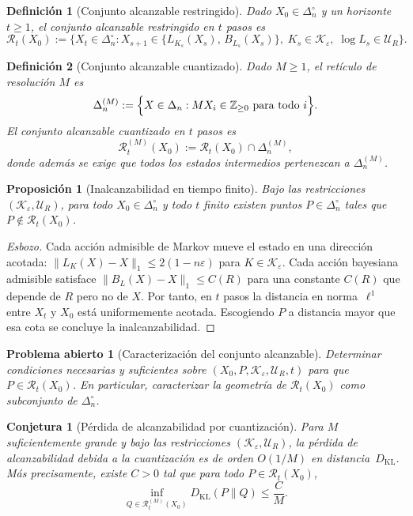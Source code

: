 \documentclass[12pt]{article}
\newtheorem{definicion}{Definición}[section]
\newtheorem{proposicion}{Proposición}[section]
\newtheorem{conjetura}{Conjetura}[section]
\newtheorem{problema}{Problema abierto}[section]
\begin{document}
\begin{definicion}[Conjunto alcanzable restringido]
\label{def:alcanzable}
Dado $X_0\in\Delta_n^\circ$ y un horizonte $t\geq 1$, el \emph{conjunto
alcanzable restringido en $t$ pasos} es
\[
\mathcal{R}_t(X_0)
:=
\bigl\{X_t\in\Delta_n^\circ :
X_{s+1}\in\{L_{K_s}(X_s),\, B_{L_s}(X_s)\},\;
K_s\in\mathcal{K}_\varepsilon,\;
\log L_s\in\mathcal{U}_R
\bigr\}.
\]
\end{definicion}

\begin{definicion}[Conjunto alcanzable cuantizado]
\label{def:alcanzable-cuant}
Dado $M\geq 1$, el \emph{retículo de resolución $M$} es
\[
\Delta_n^{(M)}
:=
\Bigl\{X\in\Delta_n : MX_i\in\mathbb{Z}_{\geq 0}\text{ para todo }i\Bigr\}.
\]
El \emph{conjunto alcanzable cuantizado en $t$ pasos} es
\[
\mathcal{R}_t^{(M)}(X_0)
:=
\mathcal{R}_t(X_0)\cap\Delta_n^{(M)},
\]
donde además se exige que todos los estados intermedios pertenezcan a
$\Delta_n^{(M)}$.
\end{definicion}

\begin{proposicion}[Inalcanzabilidad en tiempo finito]
\label{prop:inalcanzable}
Bajo las restricciones $(\mathcal{K}_\varepsilon,\mathcal{U}_R)$, para todo
$X_0\in\Delta_n^\circ$ y todo $t$ finito existen puntos $P\in\Delta_n^\circ$
tales que $P\notin\mathcal{R}_t(X_0)$.
\end{proposicion}

\begin{proof}[Esbozo]
Cada acción admisible de Markov mueve el estado en una dirección acotada:
$\|L_K(X)-X\|_1\leq 2(1-n\varepsilon)$ para $K\in\mathcal{K}_\varepsilon$.
Cada acción bayesiana admisible satisface $\|B_L(X)-X\|_1\leq C(R)$ para una
constante $C(R)$ que depende de $R$ pero no de $X$. Por tanto, en $t$ pasos la
distancia en norma~$\ell^1$ entre $X_t$ y $X_0$ está uniformemente acotada.
Escogiendo $P$ a distancia mayor que esa cota se concluye la inalcanzabilidad.
\end{proof}

\begin{problema}[Caracterización del conjunto alcanzable]
\label{prob:caracterizacion}
Determinar condiciones necesarias y suficientes sobre $(X_0, P,
\mathcal{K}_\varepsilon, \mathcal{U}_R, t)$ para que $P\in\mathcal{R}_t(X_0)$.
En particular, caracterizar la geometría de $\mathcal{R}_t(X_0)$ como
subconjunto de $\Delta_n^\circ$.
\end{problema}

\begin{conjetura}[Pérdida de alcanzabilidad por cuantización]
\label{conj:cuantizacion}
Para $M$ suficientemente grande y bajo las restricciones
$(\mathcal{K}_\varepsilon,\mathcal{U}_R)$, la pérdida de alcanzabilidad debida a
la cuantización es de orden $O(1/M)$ en distancia~$D_{\mathrm{KL}}$. Más
precisamente, existe $C>0$ tal que para todo $P\in\mathcal{R}_t(X_0)$,
\[
\inf_{Q\in\mathcal{R}_t^{(M)}(X_0)}D_{\mathrm{KL}}(P\|Q)\leq \frac{C}{M}.
\]
\end{conjetura}
\end{document}

